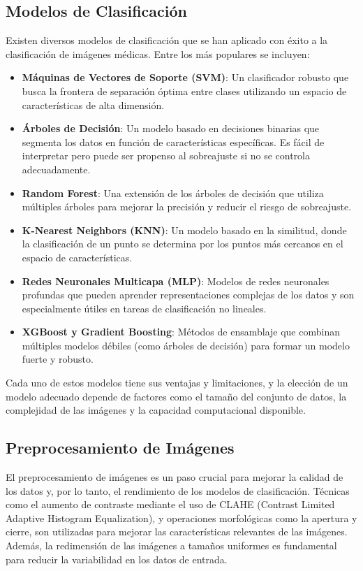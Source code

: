 \documentclass[12pt]{article}
\begin{document}
\subsection{Modelos de Clasificación}
Existen diversos modelos de clasificación que se han aplicado con éxito a la clasificación de imágenes médicas. Entre los más populares se incluyen:
\begin{itemize}
    \item \textbf{Máquinas de Vectores de Soporte (SVM)}\cite{cortes1995support}: Un clasificador robusto que busca la frontera de separación óptima entre clases utilizando un espacio de características de alta dimensión.
    \item \textbf{Árboles de Decisión}\cite{quinlan1986induction}: Un modelo basado en decisiones binarias que segmenta los datos en función de características específicas. Es fácil de interpretar pero puede ser propenso al sobreajuste si no se controla adecuadamente.
    \item \textbf{Random Forest}\cite{breiman2001random}: Una extensión de los árboles de decisión que utiliza múltiples árboles para mejorar la precisión y reducir el riesgo de sobreajuste.
    \item \textbf{K-Nearest Neighbors (KNN)}\cite{cover1967nearest}: Un modelo basado en la similitud, donde la clasificación de un punto se determina por los puntos más cercanos en el espacio de características.
    \item \textbf{Redes Neuronales Multicapa (MLP)}\cite{rumelhart1986learning}: Modelos de redes neuronales profundas que pueden aprender representaciones complejas de los datos y son especialmente útiles en tareas de clasificación no lineales.
    \item \textbf{XGBoost y Gradient Boosting}\cite{chen2016xgboost,friedman2001greedy}: Métodos de ensamblaje que combinan múltiples modelos débiles (como árboles de decisión) para formar un modelo fuerte y robusto.
\end{itemize}

Cada uno de estos modelos tiene sus ventajas y limitaciones, y la elección de un modelo adecuado depende de factores como el tamaño del conjunto de datos, la complejidad de las imágenes y la capacidad computacional disponible.

\subsection{Preprocesamiento de Imágenes}
El preprocesamiento de imágenes es un paso crucial para mejorar la calidad de los datos y, por lo tanto, el rendimiento de los modelos de clasificación. Técnicas como el aumento de contraste mediante el uso de CLAHE (Contrast Limited Adaptive Histogram Equalization)\cite{pizer1987adaptive}, y operaciones morfológicas como la apertura y cierre, son utilizadas para mejorar las características relevantes de las imágenes. Además, la redimensión de las imágenes a tamaños uniformes es fundamental para reducir la variabilidad en los datos de entrada.
\end{document}
